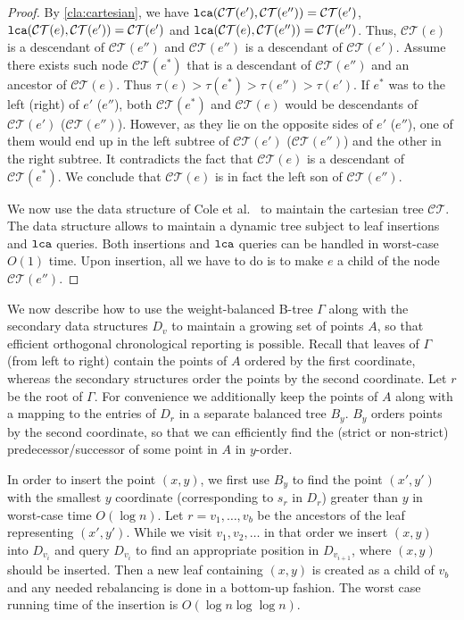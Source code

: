\documentclass[a4paper]{article}
\theoremstyle{remark}
\begin{document}
\begin{proof}
By \cref{cla:cartesian}, we have $\mathtt{lca}(\mathcal{CT}(e'),\mathcal{CT}(e''))=\mathcal{CT}(e')$,
$\mathtt{lca}(\mathcal{CT}(e),\mathcal{CT}(e'))=\mathcal{CT}(e')$ and \linebreak $\mathtt{lca}(\mathcal{CT}(e),\mathcal{CT}(e''))=\mathcal{CT}(e'')$.
Thus, $\mathcal{CT}(e)$ is a descendant of $\mathcal{CT}(e'')$ and $\mathcal{CT}(e'')$ is a descendant of $\mathcal{CT}(e')$.
Assume there exists such node $\mathcal{CT}(e^*)$ that is a descendant
of $\mathcal{CT}(e'')$ and an ancestor of $\mathcal{CT}(e)$.
Thus $\tau(e)>\tau(e^*)>\tau(e'')>\tau(e')$.
If $e^*$ was to the left (right) of $e'$ ($e''$), both
$\mathcal{CT}(e^*)$ and $\mathcal{CT}(e)$
would be descendants of $\mathcal{CT}(e')$ ($\mathcal{CT}(e'')$).
However, as they lie on the opposite sides of $e'$ ($e''$), one
of them would end up in the left subtree of $\mathcal{CT}(e')$ ($\mathcal{CT}(e'')$)
and the other in the right subtree.
It contradicts the fact that $\mathcal{CT}(e)$ is a descendant of $\mathcal{CT}(e^*)$.
We conclude that $\mathcal{CT}(e)$ is in fact the left son of $\mathcal{CT}(e'')$.

We now use the data structure of Cole et al.~\cite{Cole:2005} to maintain the cartesian tree
$\mathcal{CT}$.
The data structure allows to maintain
a dynamic tree subject to leaf insertions and $\mathtt{lca}$ queries.
Both insertions and $\mathtt{lca}$ queries can be handled in worst-case $O(1)$ time.
Upon insertion, all we have to do is to make $e$ a child
of the node $\mathcal{CT}(e'')$.
\end{proof}

We now describe how to use the weight-balanced B-tree $\Gamma$ along with the
secondary data structures $D_v$ to maintain a
growing set of points $A$, so that efficient orthogonal chronological
reporting is possible.
Recall that leaves of $\Gamma$ (from left to right) contain the points of $A$ ordered
by the first coordinate, whereas the secondary structures order the points
by the second coordinate.
Let $r$ be the root of $\Gamma$.
For convenience we additionally keep the points of $A$
along with a mapping to the entries of $D_r$
in a separate balanced tree $B_y$.
$B_y$ orders points by the second coordinate, so that
we can efficiently find the (strict or non-strict) predecessor/successor
of some point in $A$ in $y$-order.

In order to insert the point $(x,y)$, we
first use $B_y$ to find the point $(x',y')$ with the smallest $y$ coordinate
(corresponding to $s_r$ in $D_r$) greater than $y$ in worst-case time $O(\log{n})$.
Let $r=v_1,\ldots,v_b$ be the ancestors of the leaf representing $(x',y')$.
While we visit $v_1,v_2,\ldots$ in that order we insert $(x,y)$ into $D_{v_i}$
and query $D_{v_i}$ to find an appropriate position
in $D_{v_{i+1}}$, where $(x,y)$ should be inserted.
Then a new leaf containing $(x,y)$ is created as a child of $v_b$
and any needed rebalancing is done in a bottom-up fashion.
The worst case running time of the insertion is $O(\log{n}\log{\log{n}})$.
\end{document}
